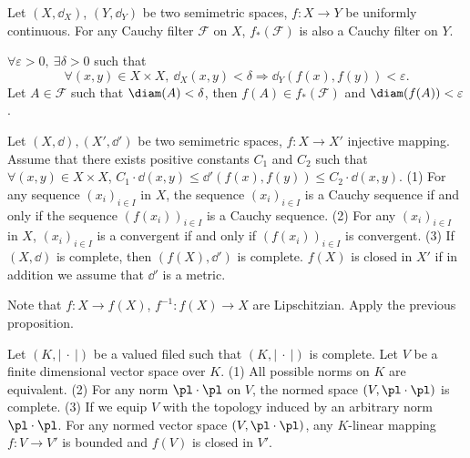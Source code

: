 \begin{propositionenv}
    Let $(X,\dd_X)$, $(Y,\dd_Y)$ be two semimetric spaces, $f:X\longrightarrow Y$ be uniformly continuous. For any Cauchy filter $\mathcal{F}$ on $X$, $f_*(\mathcal{F})$ is also a Cauchy filter on $Y$.
\end{propositionenv}
\begin{proofenv}
    $\forall \varepsilon>0,\ \exists \delta>0$ such that 
    $$\forall (x,y)\in X\times X,\ \dd_X(x,y)<\delta\Rightarrow \dd_Y(f(x),f(y))<\varepsilon.$$
    Let $A\in \mathcal{F}$ such that $\diam(A)<\delta$, then $f(A)\in f_*(\mathcal{F})$ and $\diam(f(A))<\varepsilon$.
\end{proofenv}
\begin{propositionenv}
    Let $(X,\dd),(X',\dd')$ be two semimetric spaces, $f:X\longrightarrow X'$ injective mapping. Assume that there exists positive constants $C_1$ and $C_2$ such that $\forall (x,y)\in X\times X$, $C_1\cdot \dd(x,y)\le \dd'\left(f(x),f(y)\right)\le C_2\cdot\dd(x,y)$. 
    \newline
    (1) For any sequence $(x_i)_{i\in I}$ in $X$, the sequence $(x_i)_{i\in I}$ is a Cauchy sequence if and only if the sequence $\left(f(x_i)\right)_{i\in I}$ is a Cauchy sequence.
    \newline
    (2) For any $(x_i)_{i\in I}$ in $X$, $(x_i)_{i\in I}$ is a convergent if and only if $\left(f(x_i)\right)_{i\in I}$ is convergent.
    \newline
    (3) If $(X,\dd)$ is complete, then $(f(X),\dd')$ is complete. $f(X)$ is closed in $X'$ if in addition we assume that $\dd'$ is a metric.
\end{propositionenv}
\begin{proofenv}
    Note that $f:X\longrightarrow f(X)$, $f^{-1}: f(X)\longrightarrow X$ are Lipschitzian. Apply the previous proposition.
\end{proofenv}
\begin{theoremenv}
    Let $(K,\left|\ \cdot\ \right|)$ be a valued filed such that $\left(K,\left|\ \cdot\ \right|\right)$ is complete. Let $V$ be a finite dimensional vector space over $K$. 
    \newline
    (1) All possible norms on $K$ are equivalent.
    \newline
    (2) For any norm $\pl\cdot\pl $ on $V$, the normed space $\left(V,\pl\cdot\pl\right)$ is complete.
    \newline
    (3) If we equip $V$ with the topology induced by an arbitrary norm $\pl\cdot\pl$. For any normed vector space $\left(V,\pl\cdot\pl\right)$, any $K$-linear mapping $f:V\longrightarrow V'$ is bounded and $f\left(V\right)$ is closed in $V'$.
\end{theoremenv}
